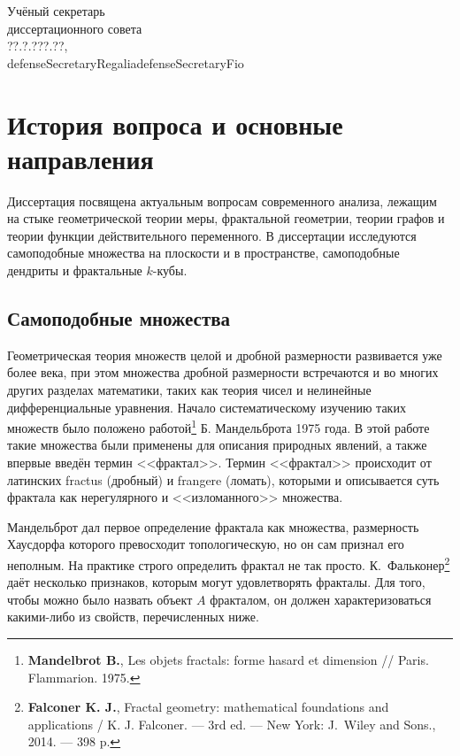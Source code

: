 \documentclass[a5paper,9pt,twoside]{extarticle} %
\begin{document}
\vspace{0.008\paperheight plus1fill}


\vspace{0.008\paperheight plus1fill}
\noindent
Учёный секретарь\\
диссертационного совета\\
??.?.???.??,\\
defenseSecretaryRegalia\hfill defenseSecretaryFio

\newpage

\section{История вопроса и основные направления}

Диссертация посвящена актуальным вопросам современного анализа, лежащим на стыке геометрической теории меры, фрактальной геометрии, теории графов и теории функции действительного переменного.
В диссертации исследуются самоподобные множества на плоскости и в пространстве, самоподобные дендриты и фрактальные $k$-кубы.

\subsection{Самоподобные множества}

Геометрическая теория множеств целой и дробной размерности развивается уже более века, при этом множества дробной размерности встречаются и во многих других разделах математики, таких как теория чисел и нелинейные дифференциальные уравнения.
Начало систематическому изучению таких множеств было положено работой\footnote{{\bf Mandelbrot B.}, Les objets fractals: forme hasard et dimension // Paris. Flammarion. 1975.} Б. Мандельброта 1975 года.
В этой работе такие множества были применены для описания природных явлений, а также впервые введён термин <<фрактал>>.
Термин <<фрактал>> происходит от латинских fractus (дробный) и frangere (ломать), которыми и описывается суть фрактала как нерегулярного и <<изломанного>> множества.

Мандельброт дал первое определение фрактала как множества, размерность Хаусдорфа которого превосходит топологическую, но он сам признал его неполным.
На практике строго определить фрактал не так просто.
К.~Фальконер\footnote{{\bf Falconer K. J.}, Fractal geometry: mathematical foundations and applications / K. J. Falconer. --- 3rd ed. --- New York: J.~Wiley and Sons., 2014. --- 398 p.} даёт несколько признаков, которым могут удовлетворять фракталы.
Для того, чтобы можно было назвать объект $A$ фракталом, он должен характеризоваться какими-либо из свойств, перечисленных ниже.
\end{document}
